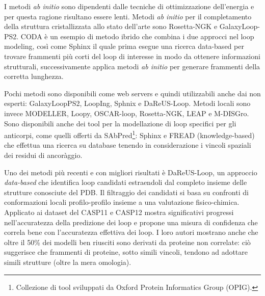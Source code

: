 \par I metodi \textit{ab initio} sono dipendenti dalle tecniche di ottimizzazione dell'energia e per questa ragione risultano essere lenti. Metodi \textit{ab initio} per il completamento della struttura cristallizzata allo stato dell'arte sono Rosetta-NGK e GalaxyLoop-PS2. CODA è un esempio di metodo ibrido che combina i due approcci nel loop modeling, così come Sphinx il quale prima esegue una ricerca data-based per trovare frammenti più corti del loop di interesse in modo da ottenere informazioni strutturali, successivamente applica metodi \textit{ab initio} per generare frammenti della corretta lunghezza. \\

\par Pochi metodi sono disponibili come web servers e quindi utilizzabili anche dai non esperti: GalaxyLoopPS2, LoopIng, Sphnix e DaReUS-Loop. Metodi locali sono invece MODELLER, Loopy, OSCAR-loop, Rosetta-NGK, LEAP e M-DISGro. Sono disponibili anche dei tool per la modellazione di loop specifici per gli anticorpi, come quelli offerti da SAbPred\footnote{Collezione di tool sviluppati da Oxford Protein Informatics Group (OPIG).}: Sphinx e FREAD (knowledge-based) che effettua una ricerca su database tenendo in considerazione i vincoli spaziali dei residui di ancoràggio.

\par Uno dei metodi più recenti e con migliori risultati è DaReUS-Loop, un approccio  \textit{data-based} che identifica loop candidati estraendoli dal completo insieme delle strutture conosciute del PDB. Il filtraggio dei candidati si basa su confronti di conformazioni locali profilo-profilo insieme a una valutazione fisico-chimica. Applicato ai dataset del CASP11 e CASP12 mostra significativi progressi nell'accuratezza della predizione dei loop e propone una misura di confidenza che correla bene con l'accuratezza effettiva dei loop. I loro autori mostrano anche che oltre il 50\% dei modelli ben riusciti sono derivati da proteine non correlate: ciò suggerisce che frammenti di proteine, sotto simili vincoli, tendono ad adottare simili strutture (oltre la mera omologia)\supercite{karami2018dareus}. 

